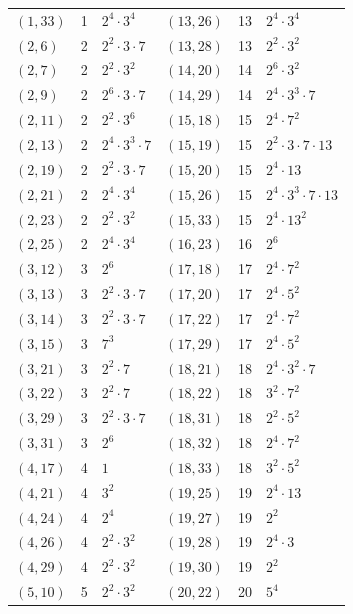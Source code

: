 \documentclass[11pt]{article}
\begin{document}
\begin{longtable}{@{}lrl@{\qquad}lrl@{}}
$(1,33)$ & 1 & $2^{4}\cdot 3^{4}$ & $(13,26)$ & 13 & $2^{4}\cdot 3^{4}$\\
$(2,6)$ & 2 & $2^{2}\cdot 3\cdot 7$ & $(13,28)$ & 13 & $2^{2}\cdot 3^{2}$\\
$(2,7)$ & 2 & $2^{2}\cdot 3^{2}$ & $(14,20)$ & 14 & $2^{6}\cdot 3^{2}$\\
$(2,9)$ & 2 & $2^{6}\cdot 3\cdot 7$ & $(14,29)$ & 14 & $2^{4}\cdot 3^{3}\cdot 7$\\
$(2,11)$ & 2 & $2^{2}\cdot 3^{6}$ & $(15,18)$ & 15 & $2^{4}\cdot 7^{2}$\\
$(2,13)$ & 2 & $2^{4}\cdot 3^{3}\cdot 7$ & $(15,19)$ & 15 & $2^{2}\cdot 3\cdot 7\cdot 13$\\
$(2,19)$ & 2 & $2^{2}\cdot 3\cdot 7$ & $(15,20)$ & 15 & $2^{4}\cdot 13$\\
$(2,21)$ & 2 & $2^{4}\cdot 3^{4}$ & $(15,26)$ & 15 & $2^{4}\cdot 3^{3}\cdot 7\cdot 13$\\
$(2,23)$ & 2 & $2^{2}\cdot 3^{2}$ & $(15,33)$ & 15 & $2^{4}\cdot 13^{2}$\\
$(2,25)$ & 2 & $2^{4}\cdot 3^{4}$ & $(16,23)$ & 16 & $2^{6}$\\
$(3,12)$ & 3 & $2^{6}$ & $(17,18)$ & 17 & $2^{4}\cdot 7^{2}$\\
$(3,13)$ & 3 & $2^{2}\cdot 3\cdot 7$ & $(17,20)$ & 17 & $2^{4}\cdot 5^{2}$\\
$(3,14)$ & 3 & $2^{2}\cdot 3\cdot 7$ & $(17,22)$ & 17 & $2^{4}\cdot 7^{2}$\\
$(3,15)$ & 3 & $7^{3}$ & $(17,29)$ & 17 & $2^{4}\cdot 5^{2}$\\
$(3,21)$ & 3 & $2^{2}\cdot 7$ & $(18,21)$ & 18 & $2^{4}\cdot 3^{2}\cdot 7$\\
$(3,22)$ & 3 & $2^{2}\cdot 7$ & $(18,22)$ & 18 & $3^{2}\cdot 7^{2}$\\
$(3,29)$ & 3 & $2^{2}\cdot 3\cdot 7$ & $(18,31)$ & 18 & $2^{2}\cdot 5^{2}$\\
$(3,31)$ & 3 & $2^{6}$ & $(18,32)$ & 18 & $2^{4}\cdot 7^{2}$\\
$(4,17)$ & 4 & $1$ & $(18,33)$ & 18 & $3^{2}\cdot 5^{2}$\\
$(4,21)$ & 4 & $3^{2}$ & $(19,25)$ & 19 & $2^{4}\cdot 13$\\
$(4,24)$ & 4 & $2^{4}$ & $(19,27)$ & 19 & $2^{2}$\\
$(4,26)$ & 4 & $2^{2}\cdot 3^{2}$ & $(19,28)$ & 19 & $2^{4}\cdot 3$\\
$(4,29)$ & 4 & $2^{2}\cdot 3^{2}$ & $(19,30)$ & 19 & $2^{2}$\\
$(5,10)$ & 5 & $2^{2}\cdot 3^{2}$ & $(20,22)$ & 20 & $5^{4}$\\

\end{longtable}
\end{document}
